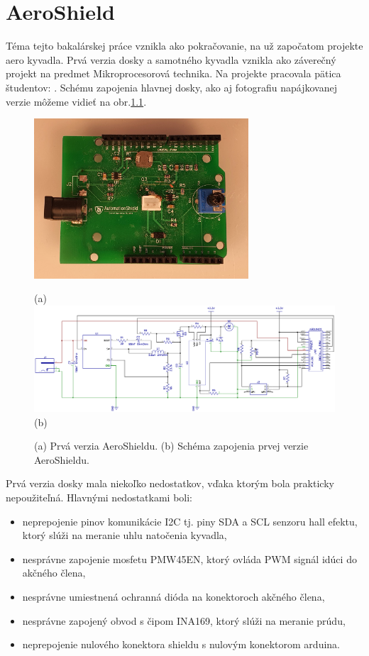 \chapter{AeroShield}

Téma tejto bakalárskej práce vznikla ako pokračovanie, na už započatom projekte aero kyvadla. Prvá verzia dosky a samotného kyvadla vznikla ako záverečný projekt na predmet Mikroprocesorová technika. Na projekte pracovala pätica študentov: . Schému zapojenia hlavnej dosky, ako aj fotografiu napájkovanej verzie môžeme vidieť na obr.\ref{OBRAZOK 2.1.1}.


\begin{figure}[!tbh]
\centering
\includegraphics[width=80mm]{obr/oldshield.jpg} 

(a)
\includegraphics[width=\linewidth]{obr/oldshieldscheme.png}
(b)
\caption{(a) Prvá verzia AeroShieldu. (b) Schéma zapojenia prvej verzie AeroShieldu.}
\label{OBRAZOK 2.1.1}
\end{figure}

\vspace{3cm}

Prvá verzia dosky mala niekoľko nedostatkov, vďaka ktorým bola prakticky nepoužiteľná. Hlavnými nedostatkami boli:

\begin{itemize}
\item neprepojenie pinov komunikácie I2C tj. piny SDA a SCL senzoru hall efektu, ktorý slúži na meranie uhlu natočenia kyvadla,   
\item nesprávne zapojenie mosfetu PMW45EN, ktorý ovláda PWM signál idúci do akčného člena,
\item nesprávne umiestnená ochranná dióda na konektoroch akčného člena, 
\item nesprávne zapojený obvod s čipom INA169, ktorý slúži na meranie prúdu,
\item neprepojenie nulového konektora shieldu s nulovým konektorom arduina.
\end{itemize}

